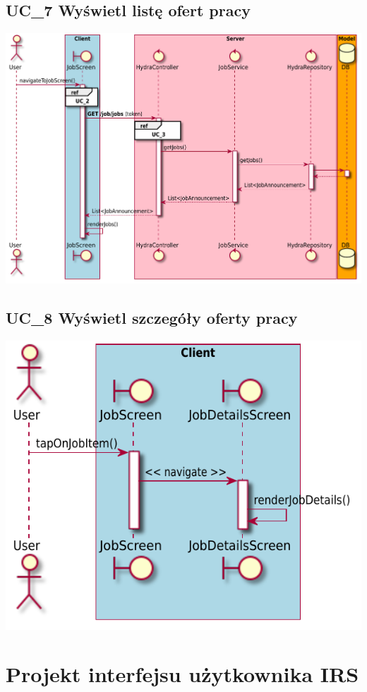 \documentclass{scrreprt}
\begin{document}
\section{UC\_7 Wyświetl listę ofert pracy}
\includegraphics[width=\textwidth, keepaspectratio]{graphics/sequence_diagram_job_list.pdf}

\section{UC\_8 Wyświetl szczegóły oferty pracy}
\includegraphics[width=\textwidth, keepaspectratio]{graphics/sequence_diagram_job_details.pdf}


\chapter{Projekt interfejsu użytkownika IRS}
\end{document}
